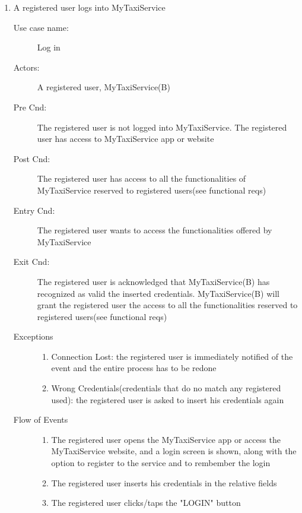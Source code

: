 \documentclass[11pt]{article} %
\begin{document}
\begin{enumerate}
	
	        \item A registered user logs into MyTaxiService
		\begin{description}
		        \item [Use case name:] Log in
		        \item [Actors:] A registered user, MyTaxiService(B)
		        \item [Pre Cnd:] The registered user is not logged into MyTaxiService. The registered
		        user has access to MyTaxiService app or website
		        \item [Post Cnd:] The registered user has access to all the functionalities of
		        MyTaxiService reserved to registered users(see functional reqs)
		        \item [Entry Cnd:] The registered user wants to access the functionalities offered by MyTaxiService
		        \item [Exit Cnd:]  The registered user is acknowledged that MyTaxiService(B) has recognized as valid the inserted
		        credentials. MyTaxiService(B) will grant the registered user the access to all the functionalities
		        reserved to registered users(see functional reqs)
		        \item [Exceptions]\hfill
			\begin{enumerate}
			          \item Connection Lost: the registered user is immediately notified of the event and the entire process
			          has to be redone
			          \item Wrong Credentials(credentials that do no match any registered used): the registered user is asked to insert his credentials again
			\end{enumerate}
		        \item [Flow of Events]\hfill
			\begin{enumerate}
			          \item The registered user opens the MyTaxiService app or access the MyTaxiService website, and a login
			          screen is shown, along with the option to register to the service and to rembember the login
			          \item The registered user inserts his credentials in the relative fields
			          \item The registered user clicks/taps the "LOGIN" button
			\end{enumerate}
		\end{description}
	

\end{enumerate}
\end{document}
